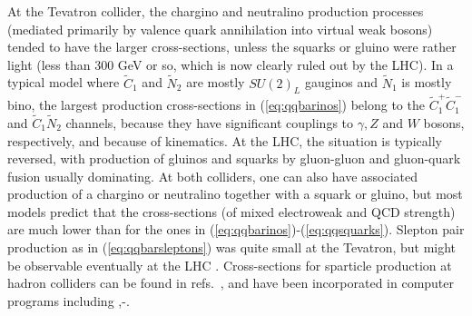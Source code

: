 \documentclass[12pt]{article}
\def\stilde{\widetilde}
\begin{document}
At the Tevatron collider, the chargino and neutralino production processes 
(mediated primarily by valence quark annihilation into virtual weak 
bosons) tended to have the larger cross-sections, unless the squarks or 
gluino were rather light (less than 300 GeV or so, which is now clearly 
ruled out by the LHC). In a typical model 
where $\stilde C_1$ and $\stilde N_2$ are mostly $SU(2)_L$ gauginos and 
$\stilde N_1$ is mostly bino, the largest production cross-sections in 
(\ref{eq:qqbarinos}) belong to the $\stilde C_1^+\stilde C_1^-$ and 
$\stilde C_1\stilde N_2$ channels, because they have significant couplings 
to $\gamma,Z$ and $W$ bosons, respectively, and because of kinematics. At 
the LHC, the situation is typically reversed, with production of gluinos 
and squarks by gluon-gluon and gluon-quark fusion usually dominating. At both 
colliders, one can also have associated production of a chargino or 
neutralino together with a squark or gluino, but most models 
predict that the 
cross-sections (of mixed electroweak and QCD strength) are much lower than 
for the ones in (\ref{eq:qqbarinos})-(\ref{eq:qqsquarks}). Slepton pair 
production as in (\ref{eq:qqbarsleptons}) was quite small at the 
Tevatron, but might be observable eventually at the LHC \cite{sleptonLHC}. 
Cross-sections for sparticle production at hadron colliders can be found 
in refs.~\cite{gluinosquarkproduction}, and have been incorporated in 
computer programs including 
\cite{ISAJET},\cite{PYTHIA}-\cite{Alwall:2011uj}.
\end{document}
